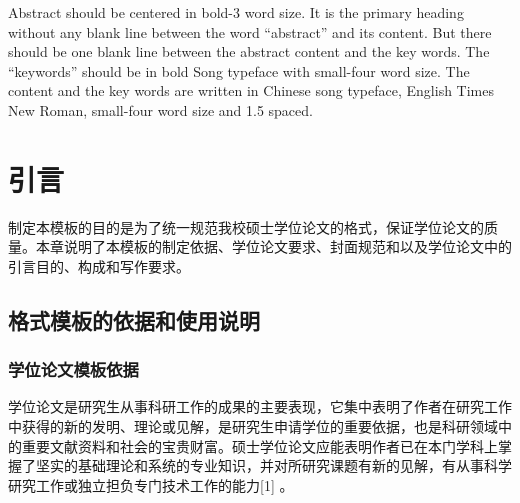 \documentclass{cqupt_thesis}
\begin{document}
\begin{enabstract}
        Abstract should be centered in bold-3 word size. It is the primary heading without any blank line between the word “abstract” and its content. But there should be one blank line between the abstract content and the key words. The “keywords” should be in bold Song typeface with small-four word size. The content and the key words are written in Chinese song typeface, English Times New Roman, small-four word size and 1.5 spaced.

    \end{enabstract}

    \maketoc %

    \makefigtablist %



    \initmaincontent %


    \chapter{引言}

    制定本模板的目的是为了统一规范我校硕士学位论文的格式，保证学位论文的质量。本章说明了本模板的制定依据、学位论文要求、封面规范和以及学位论文中的引言目的、构成和写作要求。


    \section{格式模板的依据和使用说明}

    \subsection{学位论文模板依据}

    学位论文是研究生从事科研工作的成果的主要表现，它集中表明了作者在研究工作中获得的新的发明、理论或见解，是研究生申请学位的重要依据，也是科研领域中的重要文献资料和社会的宝贵财富。硕士学位论文应能表明作者已在本门学科上掌握了坚实的基础理论和系统的专业知识，并对所研究课题有新的见解，有从事科学研究工作或独立担负专门技术工作的能力[1] 。
\end{document}
